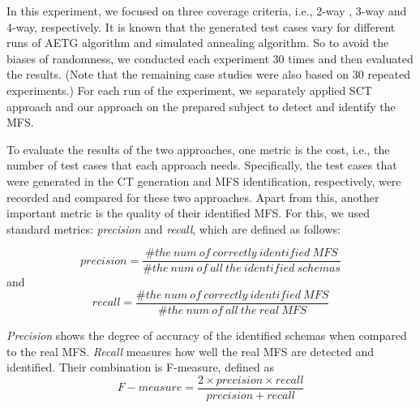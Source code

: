 \documentclass[10pt,journal,compsoc]{IEEEtran}
\begin{document}
In this experiment, we focused on three coverage criteria, i.e., 2-way , 3-way and 4-way, respectively. It is known that the generated test cases vary for different runs of AETG algorithm and simulated annealing algorithm. So to avoid the biases of randomness, we conducted each experiment 30 times and then evaluated the results. (Note that the remaining case studies were also based on 30 repeated experiments.) For each run of the experiment, we separately applied SCT approach and our approach on the prepared subject to detect and identify the MFS.

To evaluate the results of the two approaches, one metric is the cost, i.e., the number of test cases that each approach needs. Specifically, the test cases that were generated in the CT generation and MFS identification, respectively, were recorded and compared for these two approaches.  Apart from this, another important metric is the quality of their identified MFS. For this, we used standard metrics: \emph{precision} and \emph{recall}, which are defined as follows:

$$precision =  \frac{\#the\ num\ of\ correctly\ identified\  MFS}{\#the\ num\ of\ all\ the\ identified\ schemas}$$
and
$$recall  =  \frac{\#the\ num\ of\ correctly\ identified\  MFS}{\#the\ num\ of\ all\ the\ real\ MFS} $$

\emph{Precision} shows the degree of accuracy of the identified schemas when compared to the real MFS. \emph{Recall} measures how well the real MFS are detected and identified. Their combination is F-measure, defined as
$$F-measure = \frac{2 \times precision \times recall}{precision + recall}$$
%
%
%
%
\end{document}
